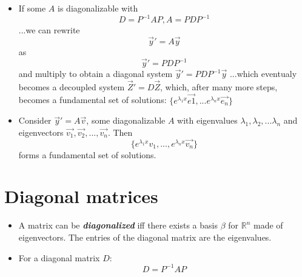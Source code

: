 \documentclass[10pt,letterpaper]{article}
\begin{document}
\begin{itemize}
\item If some $A$ is diagonalizable with 
$$D = P^{-1}AP, A=PDP^{-1}$$ 
...we can rewrite $$\vec{y}'=A\vec{y}$$ as 
$$\vec{y}'=PDP^{-1}$$
and multiply to obtain a diagonal system $\vec{y}' = PDP^{-1}\vec{y}$
...which eventualy becomes a decoupled system $\vec{Z}'=D\vec{Z}$, which,
after many more steps, becomes a fundamental set of solutions: 
$\{ e^{\lambda_1x}\vec{e1},...e^{\lambda _nx}\vec{e_n}\}$

\item Consider $\vec{y}'=A\vec{v}$, some diagonalizable $A$ with eigenvalues $\lambda_1,\lambda_2,...\lambda_n$ and eigenvectors $\vec{v_1},\vec{v_2},...,\vec{v_n}$. Then 
$$\{e^{\lambda_1x}v_1,...,e^{\lambda_nx}\vec{v_n}\}$$
forms a fundamental set of solutions. 

\end{itemize}

\section*{Diagonal matrices}

\begin{itemize}
\item A matrix can be \textbf{\textit{diagonalized}} iff there exists a basis $\beta$ for $\mathbb{R}^n$ made of eigenvectors. The entries of the diagonal matrix are the eigenvalues. 

\item For a diagonal matrix $D$: 
$$D = P^{-1}AP$$


\end{itemize}
\end{document}
